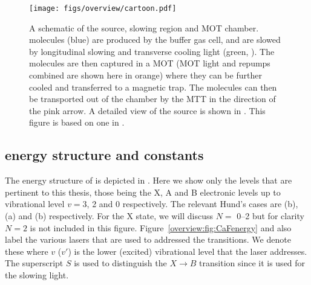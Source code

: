 \begin{figure}
  \centering
  \texttt{[image: figs/overview/cartoon.pdf]}
  \caption[\CaF{} source]{
    A schematic of the \CaF{} source, slowing region and MOT chamber.  \CaF{}
    molecules (blue) are produced by the buffer gas cell, and are slowed by
    longitudinal slowing and transverse cooling light (green, ).
    The molecules are then captured in a MOT (MOT light  and
    repumps combined are shown here in orange) where they can be further cooled
    and transferred to a magnetic trap. The molecules can then be transported
    out of the chamber by the MTT in the direction of the pink arrow. A
    detailed view of the source is shown in . This
    figure is based on one in .}
  \label{overview:fig:CaFcartoon}
\end{figure}

\subsection{\CaF{} energy structure and constants}

The energy structure of \CaF{} is depicted in
. Here we show only the levels that are
pertinent to this thesis, those being the X, A and B electronic levels up to
vibrational level $v=3$, 2 and 0 respectively. The relevant Hund's cases are
(b), (a) and (b) respectively. For the X state, we will discuss $N=$
\numrange{0}{2} but for clarity $N=2$ is not included in this figure.
%
Figure~\ref{overview:fig:CaFenergy} and  also
label the various lasers that are used to addressed the \CaF{} transitions. We
denote these  where $v$ ($v'$) is the lower (excited)
vibrational level that the laser addresses. The superscript $S$ is used to
distinguish the $X\rightarrow B$ transition since it is used for the slowing
light.


